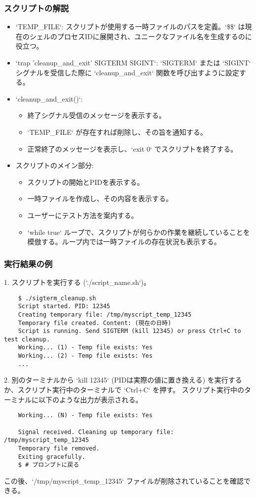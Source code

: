 \documentclass[a4paper,11pt]{jsarticle}
\begin{document}
\subsubsection*{スクリプトの解説}
\begin{itemize}
    \item `TEMP\_FILE`: スクリプトが使用する一時ファイルのパスを定義。`\$\$` は現在のシェルのプロセスIDに展開され、ユニークなファイル名を生成するのに役立つ。
    \item `trap 'cleanup\_and\_exit' SIGTERM SIGINT`: `SIGTERM` または `SIGINT` シグナルを受信した際に `cleanup\_and\_exit` 関数を呼び出すように設定する。
    \item `cleanup\_and\_exit()`:
        \begin{itemize}
            \item 終了シグナル受信のメッセージを表示する。
            \item `TEMP\_FILE` が存在すれば削除し、その旨を通知する。
            \item 正常終了のメッセージを表示し、`exit 0` でスクリプトを終了する。
        \end{itemize}
    \item スクリプトのメイン部分:
        \begin{itemize}
            \item スクリプトの開始とPIDを表示する。
            \item 一時ファイルを作成し、その内容を表示する。
            \item ユーザーにテスト方法を案内する。
            \item `while true` ループで、スクリプトが何らかの作業を継続していることを模倣する。ループ内では一時ファイルの存在状況も表示する。
        \end{itemize}
\end{itemize}

\subsubsection*{実行結果の例}
1.  スクリプトを実行する (`./script\_name.sh`)。
    \begin{verbatim}
    $ ./sigterm_cleanup.sh
    Script started. PID: 12345
    Creating temporary file: /tmp/myscript_temp_12345
    Temporary file created. Content: (現在の日時)
    Script is running. Send SIGTERM (kill 12345) or press Ctrl+C to test cleanup.
    Working... (1) - Temp file exists: Yes
    Working... (2) - Temp file exists: Yes
    ...
    \end{verbatim}
2.  別のターミナルから `kill 12345` (PIDは実際の値に置き換える) を実行するか、スクリプト実行中のターミナルで `Ctrl+C` を押す。
    スクリプト実行中のターミナルに以下のような出力が表示される。
    \begin{verbatim}
    Working... (N) - Temp file exists: Yes
    
    Signal received. Cleaning up temporary file: /tmp/myscript_temp_12345
    Temporary file removed.
    Exiting gracefully.
    $ # プロンプトに戻る
    \end{verbatim}
    この後、`/tmp/myscript\_temp\_12345` ファイルが削除されていることを確認できる。
\end{document}
